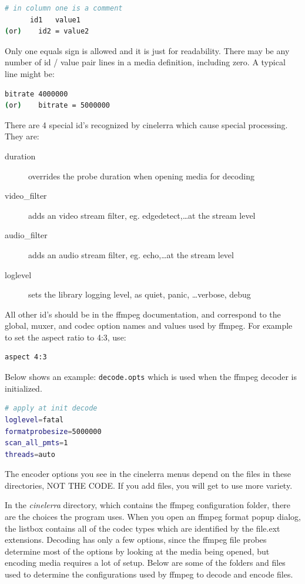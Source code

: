 \begin{lstlisting}[language=bash]
      # in column one is a comment
      id1   value1
(or)	id2 = value2
\end{lstlisting}

Only one equals sign is allowed and it is just for readability.  There may be any number of id / value pair lines in a media definition, including zero. A typical line might be:

\begin{lstlisting}[language=bash]
      bitrate 4000000
(or)	bitrate = 5000000
\end{lstlisting}

There are 4 special id's recognized by cinelerra which cause special processing.  They are:

\begin{description}
    \item[duration] overrides the probe duration when opening media for decoding
    \item[video\_filter] adds an video stream filter, eg. edgedetect,\dots at the stream level
    \item[audio\_filter] adds an audio stream filter, eg. echo,\dots at the stream level
    \item[loglevel] sets the library logging level, as quiet, panic, \dots verbose, debug
\end{description}

All other id's should be in the ffmpeg documentation, and correspond to the global, muxer, and codec option names and values used by ffmpeg.  For example to set the aspect ratio to 4:3, use:

\begin{lstlisting}[language=bash]
aspect 4:3
\end{lstlisting}

Below shows an example:  \texttt{decode.opts} which is used when the ffmpeg decoder is initialized.

\begin{lstlisting}[language=bash]
# apply at init decode
loglevel=fatal
formatprobesize=5000000
scan_all_pmts=1
threads=auto
\end{lstlisting}

The encoder options you see in the cinelerra menus depend on the files in these directories, \textsc{NOT THE CODE}.  If you add files, you will get to use more variety.

In the \textit{cinelerra} directory, which contains the ffmpeg configuration folder, there are the choices the program uses.  When you open an ffmpeg format popup dialog, the listbox contains all of the codec types which are identified by the file.ext extensions.  Decoding has only a few options, since the ffmpeg file probes determine most of the options by looking at the media being opened, but encoding media requires a lot of setup.  Below are some of the folders and files used to determine the configurations used by ffmpeg to decode and encode files.


